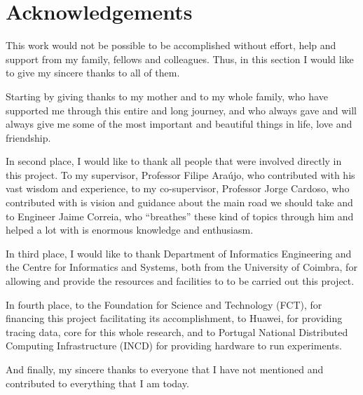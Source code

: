 
\section*{Acknowledgements}
\label{sec:acknowledgements}

This work would not be possible to be accomplished without effort, help and support from my family, fellows and colleagues. Thus, in this section I would like to give my sincere thanks to all of them.

Starting by giving thanks to my mother and to my whole family, who have supported me through this entire and long journey, and who always gave and will always give me some of the most important and beautiful things in life, love and friendship.

In second place, I would like to thank all people that were involved directly in this project. To my supervisor, Professor Filipe Araújo, who contributed with his vast wisdom and experience, to my co-supervisor, Professor Jorge Cardoso, who contributed with is vision and guidance about the main road we should take and to Engineer Jaime Correia, who ``breathes'' these kind of topics through him and helped a lot with is enormous knowledge and enthusiasm.

In third place, I would like to thank Department of Informatics Engineering and the Centre for Informatics and Systems, both from the University of Coimbra, for allowing and provide the resources and facilities to  to be carried out this project.

In fourth place, to the Foundation for Science and Technology (FCT), for financing this project facilitating its accomplishment, to Huawei, for providing tracing data, core for this whole research, and to Portugal National Distributed Computing Infrastructure (INCD) for providing hardware to run experiments.

And finally, my sincere thanks to everyone that I have not mentioned and contributed to everything that I am today.

\restoregeometry